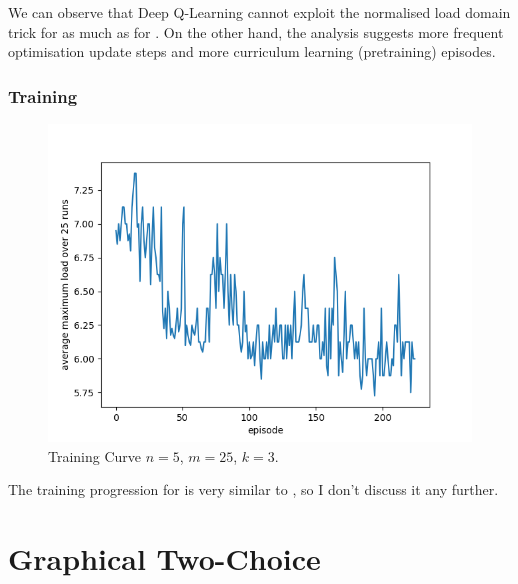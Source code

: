 We can observe that Deep Q-Learning cannot exploit the normalised load domain trick for \KThinning as much as for \TwoThinning.  On the other hand, the analysis suggests more frequent optimisation update steps and more curriculum learning (pretraining) episodes. 


\subsubsection{Training}


\begin{figure}[hbt!] \label{k-thinning-training-curve}
    \centering
    \includegraphics[scale=1.0]{Chapter4/Figs/training_progression_5_25_3.png}
    \caption{\KThinning Training Curve $n=5$, $m=25$, $k=3$. \protect \footnotemark }
\end{figure}



The training progression for \KThinning is very similar to \TwoThinning, so I don't discuss it any further.


\section{Graphical Two-Choice}



